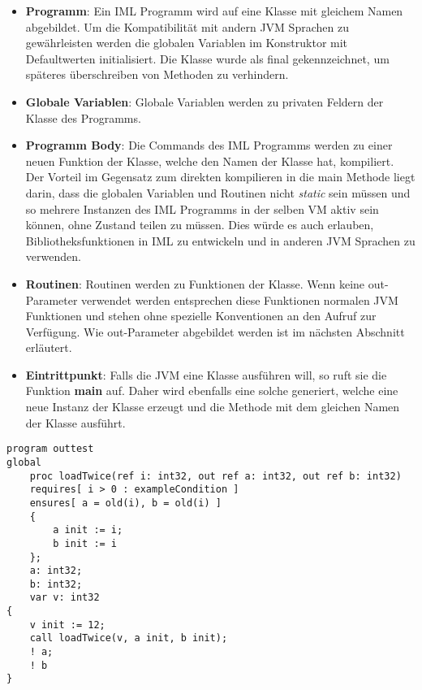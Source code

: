 \begin{itemize}
    \item \textbf{Programm}: Ein IML Programm wird auf eine Klasse mit gleichem Namen abgebildet.
                            Um die Kompatibilität mit andern JVM Sprachen zu gewährleisten werden die globalen
                            Variablen im Konstruktor mit Defaultwerten initialisiert. Die Klasse wurde als final 
                            gekennzeichnet, um späteres überschreiben von Methoden zu verhindern.
    \item \textbf{Globale Variablen}: Globale Variablen werden zu privaten Feldern der Klasse des Programms.
    \item \textbf{Programm Body}: Die Commands des IML Programms werden zu einer neuen Funktion der Klasse,
                                 welche den Namen der Klasse hat, kompiliert. Der Vorteil im Gegensatz zum 
                                 direkten kompilieren in die main Methode liegt darin, dass die globalen Variablen 
                                 und Routinen nicht \textit{static} sein müssen und so mehrere Instanzen des 
                                 IML Programms in der selben VM aktiv sein können, ohne Zustand teilen zu müssen. 
                                 Dies würde es auch erlauben, Bibliotheksfunktionen in IML zu entwickeln und 
                                 in anderen JVM Sprachen zu verwenden.
    \item \textbf{Routinen}: Routinen werden zu Funktionen der Klasse. Wenn keine out-Parameter verwendet
                             werden entsprechen diese Funktionen normalen JVM Funktionen und stehen ohne 
                             spezielle Konventionen an den Aufruf zur Verfügung. Wie out-Parameter abgebildet 
                             werden ist im nächsten Abschnitt erläutert.
    \item \textbf{Eintrittpunkt}: Falls die JVM eine Klasse ausführen will, so ruft sie die Funktion \textbf{main}
                                  auf. Daher wird ebenfalls eine solche generiert, welche eine neue Instanz der 
                                  Klasse erzeugt und die Methode mit dem gleichen Namen der Klasse ausführt.
\end{itemize}
\vspace{0.5cm}
\begin{lstlisting}[caption=Laden eines Int-Wertes in zwei Speicherstellen über out Parameter,label={lst:outtest}]
program outtest
global
    proc loadTwice(ref i: int32, out ref a: int32, out ref b: int32)
    requires[ i > 0 : exampleCondition ]
    ensures[ a = old(i), b = old(i) ]
    {
        a init := i;
        b init := i
    };
    a: int32;
    b: int32;
    var v: int32
{
    v init := 12;
    call loadTwice(v, a init, b init);
    ! a;
    ! b
}
\end{lstlisting}

